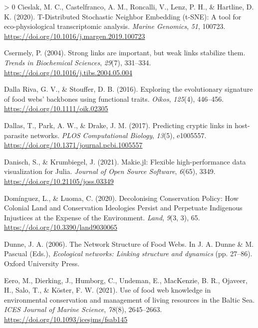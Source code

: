 \documentclass[11pt]{article}
\newlength{\cslhangindent}
\newenvironment{CSLReferences}[3] %
 {%
  \setlength{\parindent}{0pt}
  \ifodd #1 \everypar{\setlength{\hangindent}{\cslhangindent}}\ignorespaces\fi
  \ifnum #2 > 0
  \setlength{\parskip}{#2\baselineskip}
  \fi
 }%
 {}
\begin{document}
\begin{CSLReferences}{1}{0}
\leavevmode\hypertarget{ref-Cieslak2020TdiSto}{}%
Cieslak, M. C., Castelfranco, A. M., Roncalli, V., Lenz, P. H., \&
Hartline, D. K. (2020). T-Distributed Stochastic Neighbor Embedding
(t-SNE): A tool for eco-physiological transcriptomic analysis.
\emph{Marine Genomics}, \emph{51}, 100723.
\url{https://doi.org/10.1016/j.margen.2019.100723}

\leavevmode\hypertarget{ref-Csermely2004StrLin}{}%
Csermely, P. (2004). Strong links are important, but weak links
stabilize them. \emph{Trends in Biochemical Sciences}, \emph{29}(7),
331--334. \url{https://doi.org/10.1016/j.tibs.2004.05.004}

\leavevmode\hypertarget{ref-DallaRiva2016ExpEvo}{}%
Dalla Riva, G. V., \& Stouffer, D. B. (2016). Exploring the evolutionary
signature of food webs' backbones using functional traits. \emph{Oikos},
\emph{125}(4), 446--456. \url{https://doi.org/10.1111/oik.02305}

\leavevmode\hypertarget{ref-Dallas2017PreCry}{}%
Dallas, T., Park, A. W., \& Drake, J. M. (2017). Predicting cryptic
links in host-parasite networks. \emph{PLOS Computational Biology},
\emph{13}(5), e1005557.
\url{https://doi.org/10.1371/journal.pcbi.1005557}

\leavevmode\hypertarget{ref-Danisch2021MakJl}{}%
Danisch, S., \& Krumbiegel, J. (2021). Makie.jl: Flexible
high-performance data visualization for Julia. \emph{Journal of Open
Source Software}, \emph{6}(65), 3349.
\url{https://doi.org/10.21105/joss.03349}

\leavevmode\hypertarget{ref-Dominguez2020DecCon}{}%
Domínguez, L., \& Luoma, C. (2020). Decolonising Conservation Policy:
How Colonial Land and Conservation Ideologies Persist and Perpetuate
Indigenous Injustices at the Expense of the Environment. \emph{Land},
\emph{9}(3, 3), 65. \url{https://doi.org/10.3390/land9030065}

\leavevmode\hypertarget{ref-Dunne2006NetStr}{}%
Dunne, J. A. (2006). The Network Structure of Food Webs. In J. A. Dunne
\& M. Pascual (Eds.), \emph{Ecological networks: Linking structure and
dynamics} (pp. 27--86). Oxford University Press.

\leavevmode\hypertarget{ref-Eero2021UseFoo}{}%
Eero, M., Dierking, J., Humborg, C., Undeman, E., MacKenzie, B. R.,
Ojaveer, H., Salo, T., \& Köster, F. W. (2021). Use of food web
knowledge in environmental conservation and management of living
resources in the Baltic Sea. \emph{ICES Journal of Marine Science},
\emph{78}(8), 2645--2663. \url{https://doi.org/10.1093/icesjms/fsab145}


\end{CSLReferences}
\end{document}
